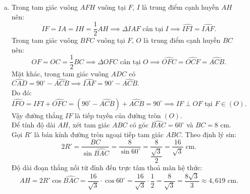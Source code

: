 \begin{bt}
{\begin{enumerate}[a)]
	Do đó:
	$$
	\dfrac{AD \cdot HF}{AH} = DK \implies \left(\dfrac{AD \cdot HF}{AH}\right)^2 = DK^2.
	$$
	Vì $DK^2 = AK \cdot KC$ nên ta có đẳng thức:
	$$
	\dfrac{AD^2 \cdot HF^2}{AH^2} = AK \cdot KC.
	$$
	\item Trong tam giác vuông $AFH$ vuông tại $F$, $I$ là trung điểm cạnh huyền $AH$ nên:
	$$
	IF = IA = IH = \dfrac{1}{2}AH \implies \Delta IAF \text{ cân tại } I \implies \widehat{IFI} = \widehat{IAF}.
	$$
	Trong tam giác vuông $BFC$ vuông tại $F$, $O$ là trung điểm cạnh huyền $BC$ nên:
	$$
	OF = OC = \dfrac{1}{2}BC \implies \Delta OFC \text{ cân tại } O \implies \widehat{OFC} = \widehat{OCF} = \widehat{ACB}.
	$$
	Mặt khác, trong tam giác vuông $ADC$ có $\widehat{CAD} = 90^\circ - \widehat{ACB} \implies \widehat{IAF} = 90^\circ - \widehat{ACB}$.\\
	Do đó:
	$$
	\widehat{IFO} = \widehat{IFI} + \widehat{OFC} = (90^\circ - \widehat{ACB}) + \widehat{ACB} = 90^\circ \implies IF \perp OF \text{ tại } F \in (O).
	$$
	Vậy đường thẳng $IF$ là tiếp tuyến của đường tròn $(O)$.\\
	Để tính độ dài $AH$, xét tam giác $ABC$ có góc $\widehat{BAC} = 60^\circ$ và $BC = 8\text{ cm}$.\\
	Gọi $R'$ là bán kính đường tròn ngoại tiếp tam giác $ABC$. Theo định lý sin:
	$$
	2R' = \dfrac{BC}{\sin \widehat{BAC}} = \dfrac{8}{\sin 60^\circ} = \dfrac{8}{\dfrac{\sqrt{3}}{2}} = \dfrac{16}{\sqrt{3}}\text{ cm}.
	$$
	Độ dài đoạn thẳng nối từ đỉnh đến trực tâm thoả mãn hệ thức:
	$$
	AH = 2R' \cos \widehat{BAC} = \dfrac{16}{\sqrt{3}} \cdot \cos 60^\circ = \dfrac{16}{\sqrt{3}} \cdot \dfrac{1}{2} = \dfrac{8}{\sqrt{3}} = \dfrac{8\sqrt{3}}{3} \approx 4{,}619\text{ cm}.
	$$
\end{enumerate}
}
\end{bt}

